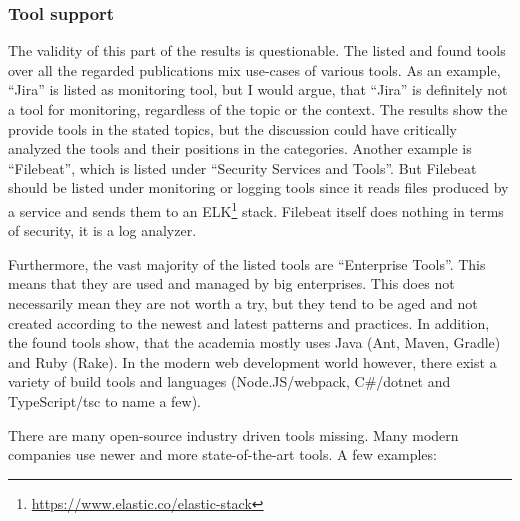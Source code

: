 \subsubsection{Tool support}

The validity of this part of the results is questionable.
The listed and found tools over all the regarded publications mix
use-cases of various tools. As an example, ``Jira'' is listed
as monitoring tool, but I would argue, that ``Jira'' is definitely
not a tool for monitoring, regardless of the topic or the context.
The results show the provide tools in the stated topics, but the
discussion could have critically analyzed the tools and their positions
in the categories. Another example is ``Filebeat'', which is listed under
``Security Services and Tools''. But Filebeat should be listed under
monitoring or logging tools since it reads files produced by a service
and sends them to an ELK\footnote{\url{https://www.elastic.co/elastic-stack}} stack.
Filebeat itself does nothing in terms of security, it is a log analyzer.

Furthermore, the vast majority of the listed tools are ``Enterprise Tools''.
This means that they are used and managed by big enterprises. This does
not necessarily mean they are not worth a try, but they tend to be aged
and not created according to the newest and latest patterns and
practices. In addition, the found tools show, that the academia mostly uses
Java (Ant, Maven, Gradle) and Ruby (Rake). In the modern web development
world however, there exist a variety of build tools and languages (Node.JS/webpack,
C\#/dotnet and TypeScript/tsc to name a few).

There are many open-source industry driven tools missing. Many
modern companies use newer and more state-of-the-art tools.
A few examples:

